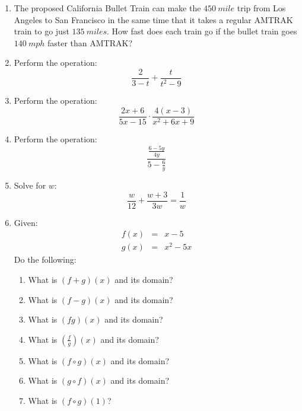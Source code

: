 \documentclass[letterpaper,12pt,fleqn]{article}
\begin{document}
\begin{enumerate}
  \newpage
  
\item The proposed California Bullet Train can make the $\SI{450}{mile}$ trip
  from Los Angeles to San Francisco in the same time that it takes a regular
  AMTRAK train to go just $\SI{135}{miles}$. How fast does each train go if the
  bullet train goes $\SI{140}{mph}$ faster than AMTRAK?

  \vspace{0.25in}

\item Perform the operation:
  \[\frac{2}{3-t}+\frac{t}{t^2-9}\]

\item Perform the operation:
  \[\frac{2x+6}{5x-15}\cdot\frac{4(x-3)}{x^2+6x+9}\]

\item Perform the operation:
  \[\frac{\frac{6-5y}{4y}}{5-\frac{6}{y}}\]

\item Solve for $w$:
  \[\frac{w}{12}+\frac{w+3}{3w}=\frac{1}{w}\]

  \vspace{0.25in}

\item Given:
  \begin{eqnarray*}
    f(x) &=& x-5 \\
    g(x) &=& x^2-5x
  \end{eqnarray*}
  Do the following:
  \begin{enumerate}
  \item What is $(f+g)(x)$ and its domain?
  \item What is $(f-g)(x)$ and its domain?
  \item What is $(fg)(x)$ and its domain?
  \item What is $\left(\frac{f}{g}\right)(x)$ and its domain?
  \item What is $(f\circ g)(x)$ and its domain?
  \item What is $(g\circ f)(x)$ and its domain?
  \item What is $(f\circ g)(1)$?
  \end{enumerate}

\end{enumerate}
\end{document}
